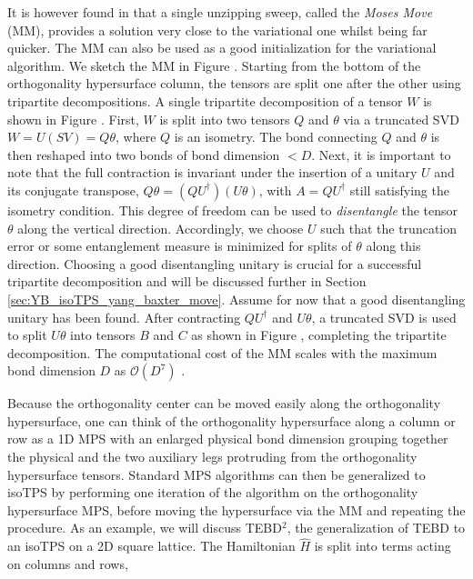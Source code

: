 It is however found in \cite{cite:isometric_tensor_network_states_in_two_dimensions} that a single unzipping sweep, called the \textit{Moses Move} (MM), provides a solution very close to the variational one whilst being far quicker. The MM can also be used as a good initialization for the variational algorithm. We sketch the MM in Figure . Starting from the bottom of the orthogonality hypersurface column, the tensors are split one after the other using tripartite decompositions. A single tripartite decomposition of a tensor $W$ is shown in Figure . First, $W$ is split into two tensors $Q$ and $\theta$ via a truncated SVD $W = U(SV) = Q\theta$, where $Q$ is an isometry. The bond connecting $Q$ and $\theta$ is then reshaped into two bonds of bond dimension $<D$. Next, it is important to note that the full contraction is invariant under the insertion of a unitary $U$ and its conjugate transpose, $Q\theta = (QU^\dagger)(U\theta)$, with $A = QU^\dagger$ still satisfying the isometry condition. This degree of freedom can be used to \textit{disentangle} the tensor $\theta$ along the vertical direction. Accordingly, we choose $U$ such that the truncation error or some entanglement measure is minimized for splits of $\theta$ along this direction. Choosing a good disentangling unitary is crucial for a successful tripartite decomposition and will be discussed further in Section \ref{sec:YB_isoTPS_yang_baxter_move}. Assume for now that a good disentangling unitary has been found. After contracting $QU^\dagger$ and $U\theta$, a truncated SVD is used to split $U\theta$ into tensors $B$ and $C$ as shown in Figure , completing the tripartite decomposition. The computational cost of the MM scales with the maximum bond dimension $D$ as $\mathcal{O}(D^7)$ \cite{cite:isometric_tensor_network_states_in_two_dimensions, cite:efficient_simulation_of_dynamics_in_two_dimensional_quantum_spin_systems}.\par
Because the orthogonality center can be moved easily along the orthogonality hypersurface, one can think of the orthogonality hypersurface along a column or row as a 1D MPS with an enlarged physical bond dimension grouping together the physical and the two auxiliary legs protruding from the orthogonality hypersurface tensors. Standard MPS algorithms can then be generalized to isoTPS by performing one iteration of the algorithm on the orthogonality hypersurface MPS, before moving the hypersurface via the MM and repeating the procedure. As an example, we will discuss TEBD$^2$, the generalization of TEBD to an isoTPS on a 2D square lattice. The Hamiltonian $\hat{H}$ is split into terms acting on columns and rows,
